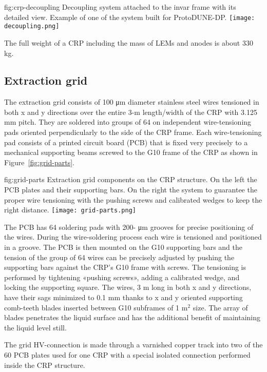 \begin{dunefigure}{fig:crp-decoupling}
{Decoupling system attached to the invar frame with its detailed view. Example of one of the system built for ProtoDUNE-DP.}
\texttt{[image: decoupling.png]}
\end{dunefigure}

The full weight of a CRP including the mass of LEMs and anodes is about 330 kg.

\subsection{Extraction grid}
\label{sec:fddp-crp-grid}
The extraction grid consists of 100 μm diameter stainless steel wires tensioned in both x and y directions over the entire 3-m length/width of the CRP with 3.125 mm pitch. They are soldered into groups of 64 on independent wire-tensioning pads oriented perpendicularly to the side of the CRP frame. Each wire-tensioning pad consists of a printed circuit board (PCB)  that is fixed very precisely to a mechanical supporting beams screwed to the G10 frame of the CRP as shown in Figure~\ref{fig:grid-parts}. 
\begin{dunefigure}{fig:grid-parts}
{Extraction grid components on the CRP structure. On the left the PCB plates and their supporting bars. On the right the system to guarantee the proper wire tensioning with the pushing screws and calibrated wedges to keep the right distance.}
\texttt{[image: grid-parts.png]}
\end{dunefigure}

The PCB has 64 soldering pads with 200- μm grooves for precise positioning of the wires. During the wire-soldering process each wire is tensioned and positioned in a groove. The PCB is then mounted on the G10 supporting bars and the tension of the group of 64 wires can be precisely adjusted by pushing the supporting bars against the CRP’s G10 frame with screws. The tensioning is performed by tightening «pushing screws», adding a calibrated wedge, and locking the supporting square.
The wires, 3 m long in both x and y directions, have their sags minimized to 0.1 mm thanks to x and y oriented supporting comb-teeth blades  inserted between G10 subframes of 1 m$^2$ size. The array of blades penetrates the liquid surface and has the additional benefit of maintaining the liquid level still.

The grid HV-connection is made through a varnished copper track into two of the 60 PCB plates used for one CRP with a special isolated connection performed inside the CRP structure.


